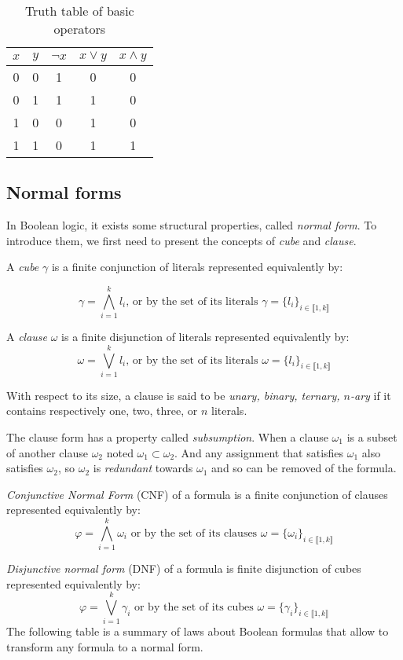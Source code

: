 \begin{table}[!htbp]
	\centering
	\begin{tabular}{cc|ccc}
		$x$ & $y$ & $\neg x$ & $x \lor y$ & $x \land y$ \\
		\toprule
		0 & 0 & 1 & 0 & 0 \\
		\midrule
		0 & 1 & 1 & 1 & 0 \\
		\midrule
		1 & 0 & 0 & 1 & 0 \\
		\midrule
		1 & 1 & 0 & 1 & 1 \\
		\bottomrule
	\end{tabular}
	\caption{Truth table of basic operators}
	\label{tab:truthtable}
\end{table}

\subsection{Normal forms}
In Boolean logic, it exists some structural properties, called \emph{normal form}.
To introduce them, we first need to present the concepts of \emph{cube} and \emph{clause}.

A \emph{cube} $\gamma$ is a finite conjunction of literals represented equivalently by:

$$\gamma = \bigwedge_{i=1}^k l_i \text{, or by the set of its literals } \gamma = \{l_i\}_{i \in \llbracket 1,k \rrbracket}$$

A \emph{clause} $\omega$ is a finite disjunction of literals represented equivalently by:
$$\omega = \bigvee_{i=1}^k l_i \text{, or by the set of its literals } \omega = \{l_i\}_{i \in \llbracket 1,k \rrbracket}$$
 

With respect to its size, a clause is said to be \emph{unary, binary, ternary, $n$-ary} if it contains respectively one, two, three, or $n$ literals.

The clause form has a property called \emph{subsumption}. 
When a clause $\omega_1$ is a subset of another clause $\omega_2$ noted $\omega_1 \subset \omega_2$. And any 
assignment that satisfies $\omega_1$ also satisfies $\omega_2$, so $\omega_2$ is \emph{redundant} towards $\omega_1$ and so can be removed of the formula.

\emph{Conjunctive Normal Form} (CNF) of a formula is a finite conjunction of clauses represented equivalently by:
  $$\varphi = \bigwedge_{i=1}^k \omega_i \text{ or by the set of its clauses } \omega = \{\omega_i\}_{i \in \llbracket 1,k \rrbracket}$$
  
\emph{Disjunctive normal form} (DNF) of a formula is finite disjunction of cubes represented equivalently by:
  $$\varphi = \bigvee_{i=1}^k \gamma_i \text{ or by the set of its cubes } \omega = \{\gamma_i\}_{i \in \llbracket 1,k \rrbracket}$$
The following table is a summary of laws about Boolean formulas that allow to transform any formula to
a normal form.

